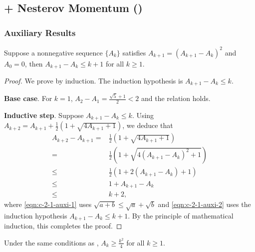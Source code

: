 \subsection{{\hdm} + Nesterov Momentum ({\hdmagd})}
\label{app:nesterov}

\subsubsection{Auxiliary Results}
\begin{lem}\label{lem:osnes-auxi}
  Suppose a nonnegative sequence $\{ A_k \}$ satisfies $A_{k + 1} = (A_{k + 1}
  - A_k)^2$ and $A_0 = 0$, then $A_{k + 1} - A_k \leq k + 1$ for all $k \geq 1$.
\end{lem}

\begin{proof}
	We prove by induction. The induction hypothesis is $A_{k + 1} - A_k \leq k$.
	
\textbf{Base case}. For $k = 1$, $A_2 - A_1 = \frac{\sqrt{5} + 1}{2} < 2$
and the relation holds.

\textbf{Inductive step}. Suppose $A_{k + 1} - A_k \leq k$. Using $A_{k + 2} = A_{k + 1} + \frac{1}{2} \left( 1 + \sqrt{4 A_{k + 1} + 1}
\right)$, we deduce that
\begin{align}
  A_{k + 2} - A_{k + 1} ={} & \tfrac{1}{2} ( 1 + \sqrt{4 A_{k + 1} + 1}
  ) \nonumber\\
  ={} & \tfrac{1}{2} ( 1 + \sqrt{4 (A_{k + 1} - A_k)^2 + 1} )
  \nonumber\\
  \leq{} & \tfrac{1}{2} (1 + 2 (A_{k + 1} - A_k) + 1) \label{eqn:c-2-1-auxi-1} \\
  \leq{} & 1 + A_{k + 1} - A_k \nonumber\\
  \leq{} & k + 2, \label{eqn:c-2-1-auxi-2}
\end{align}
where \eqref{eqn:c-2-1-auxi-1} uses $\sqrt{a + b} \leq \sqrt{a}+ \sqrt{b}$ and \eqref{eqn:c-2-1-auxi-2} uses the induction hypothesis $A_{k + 1} - A_k \leq k + 1$. By the principle of mathematical induction, this completes the proof.
\end{proof}

\begin{lem}\label{lem:osnes-auxi-2}
Under the same conditions as , $A_k \geq \frac{k^2}{4}$ for all $k \geq 1$.
\end{lem}


